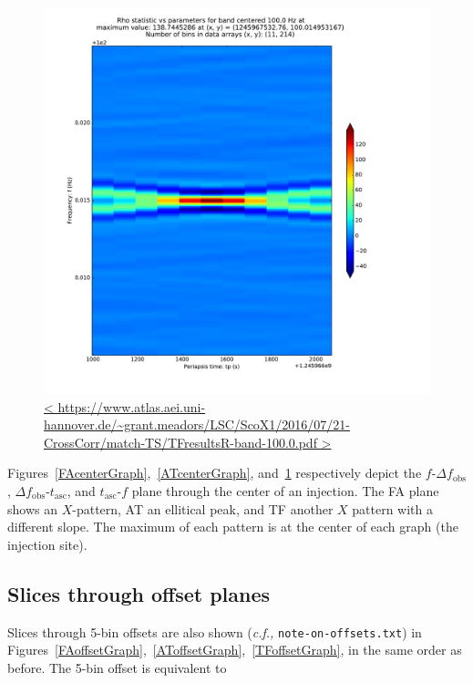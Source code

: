 \documentclass{article}
\begin{document}
\begin{figure}
\begin{center}
\includegraphics[trim= 0 0 0 0, clip, width=0.80\paperwidth,keepaspectratio]{plots/match-TS/TFresultsR-band-100-0.pdf}
\caption{
\url{<
https://www.atlas.aei.uni-hannover.de/~grant.meadors/LSC/ScoX1/2016/07/21-CrossCorr/match-TS/TFresultsR-band-100.0.pdf
>}
}
\label{TFcenterGraph}
\end{center}
\end{figure}

Figures~\ref{FAcenterGraph},~\ref{ATcenterGraph}, and~\ref{TFcenterGraph} respectively depict the $f$-$\Delta f_\mathrm{obs}$, $\Delta f_\mathrm{obs}$-$t_\mathrm{asc}$, and $t_\mathrm{asc}$-$f$ plane through the center of an injection. 
The FA plane shows an $X$-pattern, AT an ellitical peak, and TF another $X$ pattern with a different slope.
The maximum of each pattern is at the center of each graph (the injection site).

\subsection{Slices through offset planes}

Slices through 5-bin offsets are also shown (\textit{c.f.,} \texttt{note-on-offsets.txt}) in Figures~\ref{FAoffsetGraph},~\ref{AToffsetGraph},~\ref{TFoffsetGraph}, in the same order as before.
The 5-bin offset is equivalent to
\end{document}

